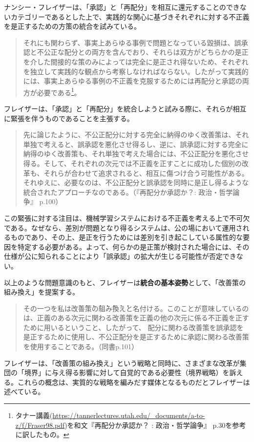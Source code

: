 \documentclass[b5j,twoside,twocolumn]{utarticle}
\begin{document}
ナンシー・フレイザーは、「承認」と「再配分」を相互に還元することのできないカテゴリーであるとした上で、実践的な関心に基づきそれぞれに対する不正義を是正するための方策の統合を試みている。
\begin{quote}
それにも関わらず、事実上あらゆる事例で問題となっている毀損は、誤承認と不公正な配分との両方を含んでおり、それらは双方がどちらかの是正を介した間接的な策のみによっては完全に是正され得ないため、それぞれを独立して実践的な観点から考察しなければならない。したがって実践的には、事実上あらゆる事例の不正義を克服するためには再配分と承認の両方が必要である\footnote{タナー講義(\url{https://tannerlectures.utah.edu/_documents/a-to-z/f/Fraser98.pdf})を和文\cite{BB10510230}『再配分か承認か？ : 政治・哲学論争』 p.30を参考に訳したもの。}。
\end{quote}
フレイザーは、「承認」と「再配分」を統合しようと試みる際に、それらが相互に緊張を伴うものであることを主張する。
\begin{quote}
先に論じたように、不公正配分に対する完全に納得のゆく改善策は、それ単独で考えると、誤承認を悪化させ得るし、逆に、誤承認に対する完全に納得のゆく改善策も、それ単独で考えた場合には、不公正配分を悪化させ得る。そして、それぞれの次元では不正義を正すことに成功した個別の改革も、それらが合わせて追求されると、相互に傷つけ合う可能性がある。それゆえに、必要なのは、不公正配分と誤承認を同時に是正し得るような統合されたアプローチなのである。（\cite{BB10510230}『再配分か承認か？: 政治・哲学論争』 p.100）
\end{quote}

この緊張に対する注目は、機械学習システムにおける不正義を考える上で不可欠である。なぜなら、差別が問題となり得るシステムは、公の場において運用されるものであり、その上、是正を行うためには差別を引き起こしている属性的な要因を特定する必要がある。よって、何らかの是正策が検討された場合には、その仕様が公に知られることにより「誤承認」の拡大が生じる可能性が否定できない。


以上のような問題意識のもと、フレイザーは\textbf{統合の基本姿勢}として、「改善策の組み換え」を提案する。
\begin{quote}
その一つを私は\.改\.善\.策\.の\.組\.み\.換\.えと名付ける。このことが意味しているのは、正義のある次元に関わる改善策を正義の他の次元に係る不正義を正すために用いるということ、したがって、
配分に関わる改善策を誤承認を是正するために使用し、不公正配分を是正するために承認に関わる改善策を使用することである。（同書p.101）
\end{quote}
フレイザーは、「改善策の組み換え」という戦略と同時に、さまざまな改革が集団の「境界」に与え得る影響に対して自覚的である必要性（境界戦略）を訴える。これらの概念は、実質的な戦略を編みだす媒体となるものだとフレイザーは述べている。
\end{document}
